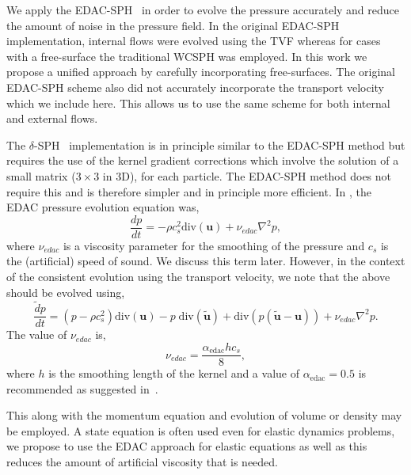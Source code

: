 \documentclass[preprint,12pt]{elsarticle}
\newcommand{\ten}[1]{\ensuremath{\mathbf{#1}}}
\begin{document}
We apply the EDAC-SPH~\cite{edac-sph:cf:2019} in order to evolve the pressure
accurately and reduce the amount of noise in the pressure field. In the
original EDAC-SPH implementation, internal flows were evolved using the TVF
whereas for cases with a free-surface the traditional WCSPH was employed. In
this work we propose a unified approach by carefully incorporating
free-surfaces. The original EDAC-SPH scheme also did not accurately
incorporate the transport velocity which we include here. This allows us to
use the same scheme for both internal and external flows.

The $\delta$-SPH~\cite{antuono-deltasph:cpc:2010} implementation is in
principle similar to the EDAC-SPH method but requires the use of the kernel
gradient corrections which involve the solution of a small matrix ($3 \times
3$ in 3D), for each particle. The EDAC-SPH method does not require this and is
therefore simpler and in principle more efficient. In \cite{edac-sph:cf:2019},
the EDAC pressure evolution equation was,
\begin{equation}
  \label{eq:edac-p-evolve-orig}
     \frac{d p}{d t} = -\rho c_s^2 \text{div}(\ten{u}) + \nu_{edac}  \nabla^2 p,
\end{equation}
where $\nu_{edac}$ is a viscosity parameter for the smoothing of the pressure
and $c_s$ is the (artificial) speed of sound. We discuss this term later.
However, in the context of the consistent evolution using the transport
velocity, we note that the above should be evolved using,
\begin{equation}
  \label{eq:edac-p-evolve}
  \frac{\tilde{d} p}{d t} =
  (p -\rho c_s^2)
    \text{div}(\ten{u})
  - p \; \text{div}(\tilde{\ten{u}})
    + \text{div}(p (\tilde{\ten{u}} - \ten{u}))
    + \nu_{edac}  \nabla^2 p.
\end{equation}
%
The value of $\nu_{edac}$ is,
\begin{equation}
  \label{eq:nu-edac}
  \nu_{edac} = \frac{\alpha_{\textrm{edac}} h c_s}{8},
\end{equation}
where $h$ is the smoothing length of the kernel and a value of
$\alpha_{\textrm{edac}}=0.5$ is recommended as suggested in~\cite{PRKP:edac-sph-iccm2015}.

This along with the momentum equation and evolution of volume or density may
be employed. A state equation is often used even for elastic dynamics
problems, we propose to use the EDAC approach for elastic equations as well as
this reduces the amount of artificial viscosity that is needed.
\end{document}
